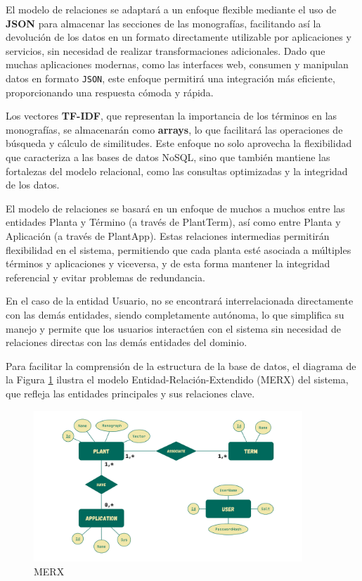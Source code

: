 El modelo de relaciones se adaptará a un enfoque flexible mediante el uso de \textbf{JSON} para almacenar las secciones de las monografías, facilitando así la devolución de los datos en un formato 
directamente utilizable por aplicaciones y servicios, sin necesidad de realizar transformaciones adicionales. Dado que muchas aplicaciones modernas, como las interfaces web, 
consumen y manipulan datos en formato \texttt{JSON}, este enfoque permitirá una integración más eficiente, proporcionando una respuesta cómoda y rápida.

Los vectores \textbf{TF-IDF}, que representan la 
importancia de los términos en las monografías, se almacenarán como \textbf{arrays}, lo que facilitará las operaciones de búsqueda y cálculo de similitudes. Este enfoque no solo 
aprovecha la flexibilidad que caracteriza a las bases de datos NoSQL, sino que también mantiene las fortalezas del modelo relacional, como las consultas optimizadas y la integridad de los datos.

El modelo de relaciones se basará en un enfoque de muchos a muchos entre las entidades Planta y Término (a través de PlantTerm), así como entre Planta y Aplicación (a través de PlantApp). 
Estas relaciones intermedias permitirán flexibilidad en el sistema, permitiendo que cada planta esté asociada a múltiples términos y aplicaciones y viceversa, y de esta forma mantener la integridad 
referencial y evitar problemas de redundancia. 

En el caso de la entidad Usuario, no se encontrará interrelacionada directamente con las demás entidades, siendo completamente autónoma, lo que simplifica su manejo y permite 
que los usuarios interactúen con el sistema sin necesidad de relaciones directas con las demás entidades del dominio.

Para facilitar la comprensión de la estructura de la base de datos, el diagrama de la Figura \ref{fig:merx} ilustra el modelo Entidad-Relación-Extendido (MERX) del sistema, que refleja las entidades principales y sus relaciones clave.

\begin{figure}[ht!]
    \centering
    \includegraphics[width=0.9\textwidth]{Images/merx.png}
    \caption{MERX}
    \label{fig:merx}
\end{figure}
